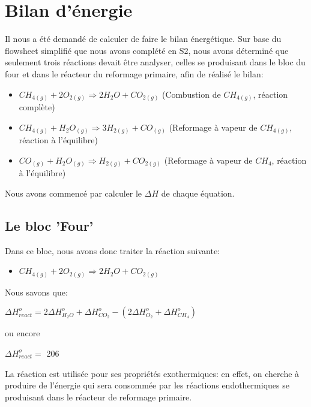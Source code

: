 \documentclass[11pt,a4paper]{report}
\author{Groupe 1246}
\begin{document}
\section*{Bilan d'énergie}
Il nous a été demandé de calculer de faire le bilan énergétique. Sur base du flowsheet simplifié que nous avons complété en S2, nous avons déterminé que seulement trois réactions devait être analyser, celles se produisant dans le bloc du four et dans le réacteur du reformage primaire, afin de réalisé le bilan:
\begin{itemize}
\item{$CH_{4(g)} + 2O_{2(g)} \Rightarrow 2H_{2}O + CO_{2(g)}$ (Combustion de $CH_{4(g)}$, réaction complète)}
\item{$CH_{4(g)} + H_{2}O_{(g)} \Rightarrow 3H_{2(g)} + CO_{(g)}$ (Reformage à vapeur de $CH_{4(g)}$, réaction à l'équilibre)}
\item{$CO_{(g)} + H_{2}O_{(g)} \Rightarrow H_{2(g)} + CO_{2(g)}$ (Reformage à vapeur de $CH_{4}$, réaction à l'équilibre)}
\end{itemize}

Nous avons commencé par calculer le $\Delta H$ de chaque équation.
\subsection*{Le bloc 'Four'}
Dans ce bloc, nous avons donc traiter la réaction suivante:
\begin{itemize}
\item{$CH_{4(g)} + 2O_{2(g)} \Rightarrow 2H_{2}O + CO_{2(g)}$}
\end{itemize}
Nous savons que:

$\Delta H^o_{react}=2\Delta H^o_{H_2O} + \Delta H^o_{CO_2} - (2\Delta H^o_{O_2} + \Delta H^o_{CH_4})$

ou encore

$\Delta H^o_{react}=$ \unit{206}{\kilo\joule\per\mole}


La réaction est utilisée pour ses propriétés exothermiques: en effet, on cherche à produire de l'énergie qui sera consommée par les réactions endothermiques se produisant dans le réacteur de reformage primaire. 
\end{document}
